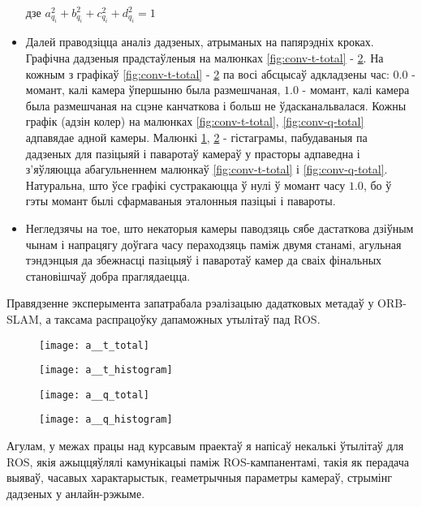 \begin{itemize}
  дзе $ a_{q_i}^2+b_{q_i}^2+c_{q_i}^2+d_{q_i}^2 = 1 $

  \item Далей праводзіцца аналіз дадзеных, атрыманых на папярэдніх кроках.
  Графічна дадзеныя прадстаўленыя на малюнках \ref{fig:conv-t-total} - \ref{fig:conv-q-histogram}.
  На кожным з графікаў \ref{fig:conv-t-total} - \ref{fig:conv-q-histogram} па восі абсцысаў
  адкладзены час: $0.0$ - момант, калі камера ўпершыню была размешчаная, $1.0$ - момант, калі
  камера была размешчаная на сцэне канчаткова і больш не ўдасканальвалася. Кожны графік (адзін колер) на
  малюнках \ref{fig:conv-t-total}, \ref{fig:conv-q-total} адпавядае адной камеры.
  Малюнкі \ref{fig:conv-t-histogram}, \ref{fig:conv-q-histogram} - гістаграмы, пабудаваныя па дадзеных
  для пазіцыяй і паваротаў камераў у прасторы адпаведна і з'яўляюцца абагульненнем малюнкаў \ref{fig:conv-t-total}
  і \ref{fig:conv-q-total}. Натуральна, што ўсе графікі сустракаюцца ў нулі ў момант часу $1.0$,
  бо ў гэты момант былі сфармаваныя эталонныя пазіцыі і павароты.

  \item Негледзячы на тое, што некаторыя камеры паводзяць сябе дастаткова дзіўным чынам і напрацягу доўгага
  часу пераходзяць паміж двумя станамі, агульная тэндэнцыя да збежнасці пазіцыяў і паваротаў камер
  да сваіх фінальных становішчаў добра праглядаецца.

\end{itemize}

Правядзенне эксперымента запатрабала рэалізацыю дадатковых метадаў у ORB-SLAM, а таксама
распрацоўку дапаможных утылітаў пад ROS.

\begin{figure}[H]
\centering
\begin{minipage}{.5\textwidth}
  \centering
  \texttt{[image: a\_\_t\_total]}
  \captionsetup{labelformat=empty}
  \label{fig:conv-t-total}
\end{minipage}%
\begin{minipage}{.5\textwidth}
  \centering
  \texttt{[image: a\_\_t\_histogram]}
  \captionsetup{labelformat=empty}
  \label{fig:conv-t-histogram}
\end{minipage}
\end{figure}

\begin{figure}[H]
\centering
\begin{minipage}{.5\textwidth}
  \centering
  \texttt{[image: a\_\_q\_total]}
  \captionsetup{labelformat=empty}
  \label{fig:conv-q-total}
\end{minipage}%
\begin{minipage}{.5\textwidth}
  \centering
  \texttt{[image: a\_\_q\_histogram]}
  \captionsetup{labelformat=empty}
  \label{fig:conv-q-histogram}
\end{minipage}
\end{figure}

Агулам, у межах працы над курсавым праектаў я напісаў некалькі ўтылітаў для ROS, якія
ажыццяўлялі камунікацыі паміж ROS-кампанентамі, такія як перадача выяваў, часавых
характарыстык, геаметрычныя параметры камераў, стрымінг дадзеных у анлайн-рэжыме.

\newpage
